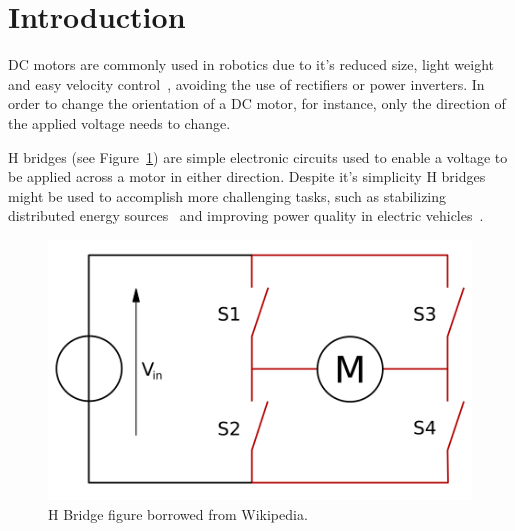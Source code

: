 \section{\textbf{Introduction}}\label{sec:1}
	DC motors are commonly used in robotics due to it's reduced size, light weight and easy velocity control~\cite{CHAPMAN}, avoiding the use of rectifiers or power inverters. In order to change the orientation of a DC motor, for instance, only the direction of the applied voltage needs to change.

	H bridges (see Figure~\ref{fig:bridge}) are simple electronic circuits used to enable a voltage to be applied across a motor in either direction. Despite it's simplicity H bridges might be used to accomplish more challenging tasks, such as stabilizing distributed energy sources~\cite{H-POWER-QUALITY} and improving power quality in electric vehicles~\cite{H-FILTERING}.

\begin{figure}[h]
    \centering
    \centering%
    \includegraphics[height=.25\textwidth]{img/H_bridge.png}
    \caption[caption H Bridge]{H Bridge figure borrowed from Wikipedia\protect\footnotemark.}
    \label{fig:bridge}%
\end{figure}
